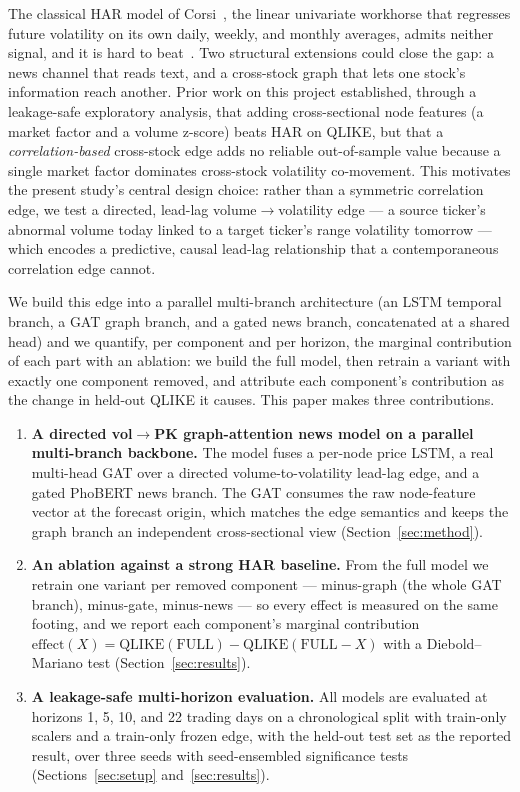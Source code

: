 \documentclass[runningheads]{llncs}
\begin{document}
The classical HAR model of Corsi~\cite{corsi2009}, the linear univariate workhorse that regresses future
volatility on its own daily, weekly, and monthly averages, admits neither signal, and it is hard to
beat~\cite{audrino2025}. Two structural extensions could close the gap: a news channel that reads text, and
a cross-stock graph that lets one stock's information reach another. Prior work on this project
established, through a leakage-safe exploratory analysis, that adding cross-sectional node features (a
market factor and a volume z-score) beats HAR on QLIKE, but that a \emph{correlation-based} cross-stock
edge adds no reliable out-of-sample value because a single market factor dominates cross-stock volatility
co-movement. This motivates the present study's central design choice: rather than a symmetric correlation
edge, we test a directed, lead-lag volume$\to$volatility edge --- a source ticker's abnormal volume today
linked to a target ticker's range volatility tomorrow --- which encodes a predictive, causal lead-lag
relationship that a contemporaneous correlation edge cannot.

We build this edge into a parallel multi-branch architecture (an LSTM temporal branch, a GAT graph branch,
and a gated news branch, concatenated at a shared head) and we quantify, per component and per horizon, the
marginal contribution of each part with an ablation: we build the full model, then retrain a variant with
exactly one component removed, and attribute each component's contribution as the change in held-out QLIKE
it causes. This paper makes three contributions.
\begin{enumerate}
\item \textbf{A directed vol$\to$PK graph-attention news model on a parallel multi-branch backbone.} The
model fuses a per-node price LSTM, a real multi-head GAT over a directed volume-to-volatility lead-lag edge,
and a gated PhoBERT news branch. The GAT consumes the raw node-feature vector at the forecast origin, which
matches the edge semantics and keeps the graph branch an independent cross-sectional view
(Section~\ref{sec:method}).
\item \textbf{An ablation against a strong HAR baseline.} From the full model we retrain one variant per
removed component --- minus-graph (the whole GAT branch), minus-gate, minus-news --- so every effect is
measured on the same footing, and we report each component's marginal contribution
$\text{effect}(X)=\text{QLIKE}(\text{FULL})-\text{QLIKE}(\text{FULL}{-}X)$ with a Diebold--Mariano test
(Section~\ref{sec:results}).
\item \textbf{A leakage-safe multi-horizon evaluation.} All models are evaluated at horizons 1, 5, 10, and
22 trading days on a chronological split with train-only scalers and a train-only frozen edge, with the
held-out test set as the reported result, over three seeds with seed-ensembled significance tests
(Sections~\ref{sec:setup} and~\ref{sec:results}).
\end{enumerate}
\end{document}
